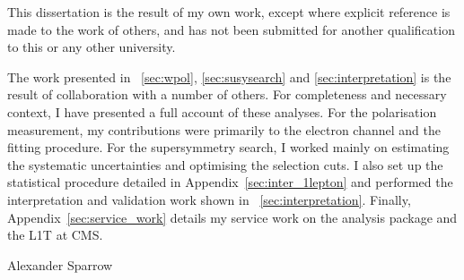 \begin{declaration}
  This dissertation is the result of my own work, except where explicit
  reference is made to the work of others, and has not been submitted
  for another qualification to this or any other university.

  The work presented in \chaps~\ref{sec:wpol}, \ref{sec:susysearch} and
  \ref{sec:interpretation} is the result of collaboration with a number of
  others. For completeness and necessary context, I have presented a full
  account of these analyses. For the \PW polarisation measurement, my
  contributions were primarily to the electron channel and the fitting
  procedure. For the supersymmetry search, I worked mainly on estimating the
  systematic uncertainties and optimising the selection cuts. I also set up the
  statistical procedure detailed in Appendix~\ref{sec:inter_1lepton} and
  performed the interpretation and validation work shown in
  \chap~\ref{sec:interpretation}. Finally, Appendix~\ref{sec:service_work}
  details my service work on the  analysis package and the \acl{L1T} at
  \ac{CMS}.

  \vspace*{1cm}
  \begin{flushright}
    Alexander Sparrow
  \end{flushright}
\end{declaration}


